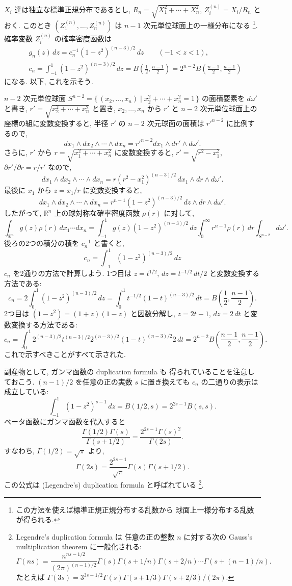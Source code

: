 \documentclass[12pt,twoside]{jarticle}
\newcommand\R{{\mathbb R}} %
\renewcommand\d{\partial}
\theoremstyle{jplain}
\theoremstyle{jplain}
\theoremstyle{jplain}
\numberwithin{theorem}{section}
\numberwithin{equation}{section}
\numberwithin{figure}{section}
\numberwithin{table}{section}
\begin{document}
$X_i$ 達は独立な標準正規分布であるとし, $R_n=\sqrt{X_1^2+\cdots+X_n^2}$,
$Z^{(n)}_i=X_i/R_n$ とおく.
このとき $(Z^{(n)}_1,\ldots,Z^{(n)}_n)$ は $n-1$ 次元単位球面上の一様分布になる%
\footnote{この方法を使えば標準正規正規分布する乱数から
球面上一様分布する乱数が得られる.}.
確率変数 $Z^{(n)}_i$ の確率密度函数は
\begin{align*}
&
g_n(z)\,dz = c_n^{-1} (1-z^2)^{(n-3)/2}\,dz \qquad (-1<z<1),
\\ &
c_n
= \int_{-1}^1 (1-z^2)^{(n-3)/2}\,dz
= B\left( \frac{1}{2},\frac{n-1}{2} \right)
= 2^{n-2} B\left(\frac{n-1}{2},\frac{n-1}{2}\right)
\end{align*}
になる. 以下, これを示そう.

$n-2$ 次元単位球面 $S^{n-2}=\{\,(x_2,\ldots,x_n)\mid x_2^2+\cdots+x_n^2=1\,\}$
の面積要素を $d\omega'$ と書き,
$r'=\sqrt{x_2^2+\cdots+x_n^2}$ と置き,
$x_2,\ldots,x_n$ から $r'$ と $n-2$ 次元単位球面上の座標の組に変数変換すると,
半径 $r'$ の $n-2$ 次元球面の面積は $r'^{n-2}$ に比例するので,
\[
dx_1\wedge dx_2\wedge\cdots\wedge dx_n
=r'^{n-2}dx_1\wedge dr'\wedge d\omega'.
\]
さらに, $r'$ から $r=\sqrt{x_1^2+\cdots+x_n^2}$ に変数変換すると,
$r'=\sqrt{r^2-x_1^2}$, $\d r'/\d r=r/r'$ なので,
\[
dx_1\wedge dx_2\wedge\cdots\wedge dx_n
=r(r^2-x_1^2)^{(n-3)/2}\,dx_1\wedge dr\wedge d\omega'.
\]
最後に $x_1$ から $z=x_1/r$ に変数変換すると,
\[
dx_1\wedge dx_2\wedge\cdots\wedge dx_n
=r^{n-1}(1-z^2)^{(n-3)/2}\,dz\wedge dr\wedge d\omega'.
\]
したがって, $\R^n$ 上の球対称な確率密度函数 $\rho(r)$ に対して,
\[
\int_{\R^n} g(z)\rho(r)\,dx_1\cdots dx_n
=
\int_{-1}^1 g(z)(1-z^2)^{(n-3)/2}\,dz
\int_0^\infty r^{n-1}\rho(r)\,dr
\int_{S^{n-2}}d\omega'.
\]
後ろの2つの積分の積を $c_n^{-1}$ と書くと,
\[
c_n=\int_{-1}^1 (1-z^2)^{(n-3)/2}\,dz
\]
$c_n$ を2通りの方法で計算しよう.
1つ目は $z=t^{1/2}$, $dz=t^{-1/2}\,dt/2$ と変数変換する方法である:
\[
c_n
=2\int_0^1 (1-z^2)^{(n-3)/2}\,dz
=\int_0^1 t^{-1/2}(1-t)^{(n-3)/2}\,dt
=B\left(\frac{1}{2},\frac{n-1}{2}\right).
\]
2つ目は $(1-z^2)=(1+z)(1-z)$ と因数分解し,
$z=2t-1$, $dz=2\,dt$ と変数変換する方法である:
\[
c_n
=\int_0^1 2^{(n-3)/2}t^{(n-3)/2}2^{(n-3)/2}(1-t)^{(n-3)/2}2\,dt
=2^{n-2}B\left(\frac{n-1}{2},\frac{n-1}{2}\right).
\]
これで示すべきことがすべて示された.

副産物として, ガンマ函数の duplication formula も
得られていることを注意しておこう.
$(n-1)/2$ を任意の正の実数 $s$ に置き換えても
$c_n$ の二通りの表示は成立している:
\[
\int_{-1}^1 (1-z^2)^{s-1}\,dz
=B(1/2,s)
=2^{2s-1}B(s,s).
\]
ベータ函数にガンマ函数を代入すると
\[
\frac{\Gamma(1/2)\Gamma(s)}{\Gamma(s+1/2)}
=\frac{2^{2s-1}\Gamma(s)^2}{\Gamma(2s)}.
\]
すなわち, $\Gamma(1/2)=\sqrt{\pi}$ より,
\[
\Gamma(2s) = \frac{2^{2s-1}}{\sqrt{\pi}}\Gamma(s)\Gamma(s+1/2).
\]
この公式は (Legendre's) duplication formula と呼ばれている%
\footnote{Legendre's duplication formula は
任意の正の整数 $n$ に対する次の Gauss's multiplication theorem に一般化される:
\[
\Gamma(ns)=\frac{n^{ns-1/2}}{(2\pi)^{(n-1)/2}}
\Gamma(s)\Gamma(s+1/n)\Gamma(s+2/n)\cdots\Gamma(s+(n-1)/n).
\]
たとえば \(
\Gamma(3s)=3^{3s-1/2}\Gamma(s)\Gamma(s+1/3)\Gamma(s+2/3)/(2\pi)
\).
}.
\end{document}
